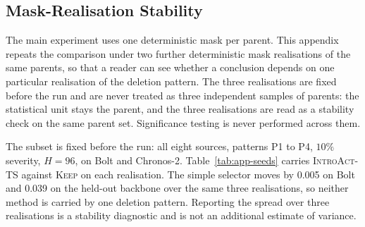 \documentclass{article}
\newcommand{\introact}{\textsc{IntroAct-TS}}
\begin{document}
\subsection{Mask-Realisation Stability}
\label{app:seeds}
The main experiment uses one deterministic mask per parent. This appendix repeats the
comparison under two further deterministic mask realisations of the same parents, so that a
reader can see whether a conclusion depends on one particular realisation of the deletion
pattern. The three realisations are fixed before the run and are never treated as three
independent samples of parents: the statistical unit stays the parent, and the three
realisations are read as a stability check on the same parent set. Significance testing is
never performed across them.

The subset is fixed before the run: all eight sources, patterns P1 to P4, $10\%$ severity,
$H=96$, on Bolt and Chronos-2. Table~\ref{tab:app-seeds} carries \introact{} against
\textsc{Keep} on each realisation. The simple selector moves by 0.005 on
Bolt and 0.039 on the held-out backbone over the same three realisations,
so neither method is carried by one deletion pattern. Reporting the spread over three
realisations is a stability diagnostic and is not an additional estimate of variance.

\begin{table}[h]
  \caption{Mask-realisation stability. Each row is one deterministic mask realisation on the
  pre-registered subset. The spread across realisations is a stability diagnostic and is not
  an additional sample of parents.}
  \label{tab:app-seeds}
  \centering
  \small
  \setlength{\tabcolsep}{4pt}
\end{table}
\end{document}
